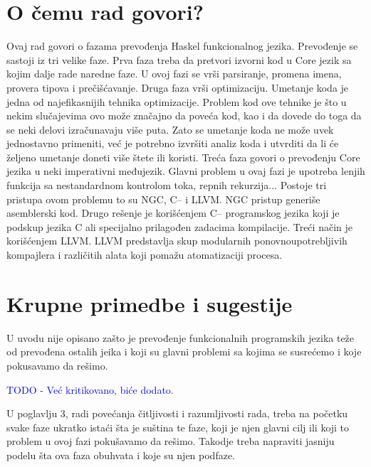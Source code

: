 \documentclass[a4paper]{report}
\newcommand{\odgovor}[1]{\textcolor{blue}{#1}}
\begin{document}
	\section{O čemu rad govori?}
	Ovaj rad govori o fazama prevođenja Haskel funkcionalnog jezika. Prevođenje se sastoji iz tri velike faze.
	Prva faza treba da pretvori izvorni kod u Core jezik sa kojim dalje rade naredne faze. U ovoj fazi se vrši parsiranje, promena imena, provera tipova i prečišćavanje.
	Druga faza vrši optimizaciju. Umetanje koda je jedna od najefikasnijih tehnika optimizacije. Problem kod ove tehnike je što u nekim slučajevima ovo može značajno da poveća kod, kao i da dovede do toga da se neki delovi izračunavaju više puta. Zato se umetanje koda ne može uvek jednostavno primeniti, već je potrebno izvršiti analiz koda i utvrditi da li će željeno umetanje doneti više štete ili koristi.
	Treća faza govori o prevođenju Core jezika u neki imperativni međujezik. Glavni problem u ovaj fazi je upotreba lenjih funkcija sa nestandardnom kontrolom toka, repnih rekurzija... Postoje tri pristupa ovom problemu to su NGC, C-- i LLVM. NGC pristup generiše asemblerski kod. Drugo rešenje je korišćenjem C-- programskog jezika koji je podskup jezika C ali specijalno prilagođen zadacima kompilacije. Treći način je korišćenjem LLVM. LLVM predstavlja skup modularnih ponovnoupotrebljivih kompajlera i različitih alata koji pomažu atomatizaciji procesa.
	
	\section{Krupne primedbe i sugestije}
	
	U uvodu nije opisano zašto je prevođenje funkcionalnih programskih jezika teže od prevođena ostalih jeika i koji su glavni problemi sa kojima se susrećemo i koje pokusavamo da rešimo.
	
	\odgovor{TODO - Već kritikovano, biće dodato.}
	
	U poglavlju 3, radi povećanja čitljivosti i razumljivosti rada, treba na početku svake faze ukratko istaći šta je suština te faze, koji je njen glavni cilj ili koji to problem u ovoj fazi pokušavamo da rešimo. Takodje treba napraviti jasniju podelu šta ova faza obuhvata i koje su njen podfaze.
	
\end{document}

